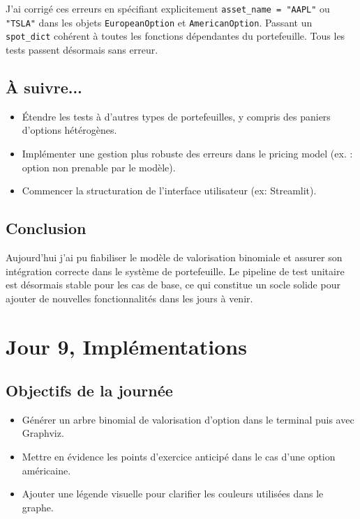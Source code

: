 \documentclass[a4paper,11pt]{article}
\begin{document}
J'ai corrigé ces erreurs en spécifiant explicitement \texttt{asset\_name = "AAPL"} ou \texttt{"TSLA"} dans les objets \texttt{EuropeanOption} et \texttt{AmericanOption}. Passant un \texttt{spot\_dict} cohérent à toutes les fonctions dépendantes du portefeuille. Tous les tests passent désormais sans erreur.

\subsection{À suivre...}
\begin{itemize}
    \item Étendre les tests à d’autres types de portefeuilles, y compris des paniers d’options hétérogènes.
    \item Implémenter une gestion plus robuste des erreurs dans le pricing model (ex. : option non prenable par le modèle).
    \item Commencer la structuration de l’interface utilisateur (ex: Streamlit).
\end{itemize}

\subsection{Conclusion}

Aujourd'hui j'ai pu fiabiliser le modèle de valorisation binomiale et assurer son intégration correcte dans le système de portefeuille. Le pipeline de test unitaire est désormais stable pour les cas de base, ce qui constitue un socle solide pour ajouter de nouvelles fonctionnalités dans les jours à venir.

\newpage


\section{Jour 9, Implémentations}

\subsection{Objectifs de la journée}
\begin{itemize}
    \item Générer un arbre binomial de valorisation d'option dans le terminal puis avec Graphviz.
    \item Mettre en évidence les points d'exercice anticipé dans le cas d'une option américaine.
    \item Ajouter une légende visuelle pour clarifier les couleurs utilisées dans le graphe.
\end{itemize}
\end{document}
